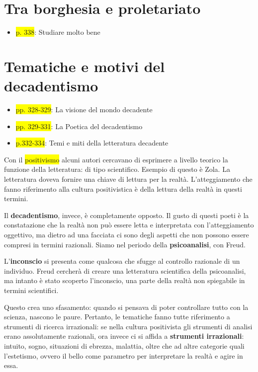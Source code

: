 \documentclass{book}
\newcommand{\pagine}[1]{\colorbox{yellow}{#1}}
\newcommand{\evidenziatore}[1]{\textbf{#1}}
\begin{document}
\section{Tra borghesia e proletariato}

\begin{itemize}

\item
  \pagine{p. 338}: Studiare molto bene
\end{itemize}

\section{Tematiche e motivi del decadentismo}

\begin{itemize}

\item
  \pagine{pp. 328-329}: La visione del mondo decadente
\item
  \pagine{pp. 329-331}: La Poetica del decadentismo
\item
  \pagine{p.332-334}: Temi e miti della letteratura decadente
\end{itemize}

Con il \pagine{positivismo} alcuni autori cercavano di esprimere a
livello teorico la funzione della letteratura: di tipo scientifico.
Esempio di questo è Zola. La letteratura doveva fornire una chiave di
lettura per la realtà. L'atteggiamento che fanno riferimento alla
cultura positivistica è della lettura della realtà in questi termini.

Il \evidenziatore{decadentismo}, invece, è completamente opposto. Il
gusto di questi poeti è la constatazione che la realtà non può essere
letta e interpretata con l'atteggiamento oggettivo, ma dietro ad una
facciata ci sono degli aspetti che non possono essere compresi in
termini razionali. Siamo nel periodo della \textbf{psicoanalisi}, con
Freud.

L'\evidenziatore{inconscio} si presenta come qualcosa che sfugge al
controllo razionale di un individuo. Freud cercherà di creare una
letteratura scientifica della psicoanalisi, ma intanto è stato scoperto
l'inconscio, una parte della realtà non spiegabile in termini
scientifici.

Questo crea uno sfasamento: quando si pensava di poter controllare tutto
con la scienza, nascono le paure. Pertanto, le tematiche fanno tutte
riferimento a strumenti di ricerca irrazionali: se nella cultura
positivista gli strumenti di analisi erano assolutamente razionali, ora
invece ci si affida a \evidenziatore{strumenti irrazionali}: intuito,
sogno, situazioni di ebrezza, malattia, oltre che ad altre categorie
quali l'estetismo, ovvero il bello come parametro per interpretare la
realtà e agire in essa.
\end{document}
